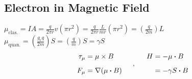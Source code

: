 \documentclass[12pt]{article}
\newcommand*{\dotP}{\boldsymbol \cdot}	%
\begin{document}
\newpage
\subsection{Electron in Magnetic Field}

\vspace{10pt} \noindent
\(\mu_\text{clas.} = IA = \frac{q}{2 \pi r} v (\pi r^2) 
    = \frac{q}{2 \pi r} \frac{L}{m r} (\pi r^2) = \left( \frac{q}{2m} \right) L\)\\[10pt]
\(\mu_\text{quan.} = \left( \frac{g_e q}{2m} \right) S = \left( \frac{q}{m} \right) S = \gamma S\)
\[\begin{aligned}
    \tau_\mu &= \mu \times B \\[5pt]
    F_\mu &= \nabla(\mu \dotP B)
\end{aligned}
\indent , \indent\begin{aligned}
    H &= -\mu \dotP B \\[5pt]
    &= - \gamma S \dotP B
\end{aligned}\]
\end{document}
